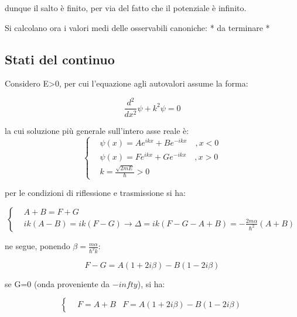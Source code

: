 \documentclass{article}
\begin{document}
dunque il salto è finito, per via del fatto che il potenziale è infinito.

Si calcolano ora i valori medi delle osservabili canoniche: * da terminare *

\subsection{Stati del continuo}
Considero E>0, per cui l'equazione agli autovalori assume la forma:

\begin{equation}
    \frac{d^2}{dx^2} \psi+k^2\psi=0
\end{equation}

la cui soluzione più generale sull'intero asse reale è:
\begin{equation}
    \left\{
    \begin{aligned}
         & \psi(x)=Ae^{ikx}+Be^{-ikx} \quad , x<0 \\
         & \psi(x)=Fe^{ikx}+Ge^{-ikx} \quad , x>0 \\
         & k=\frac{\sqrt{2mE}}{\hbar}>0
    \end{aligned}
    \right.
\end{equation}

per le condizioni di riflessione e trasmissione si ha:

\begin{equation}
    \left\{
    \begin{aligned}
         & A+B=F+G                                                                        \\
         & ik(A-B)=ik(F-G) \rightarrow \Delta= ik(F-G-A+B)=-\frac{2m\alpha}{\hbar^2}(A+B)
    \end{aligned}
    \right.
\end{equation}

ne segue, ponendo $\beta=\frac{m\alpha}{\hbar^2k}$:

\begin{equation}
    F-G=A(1+2i\beta)-B(1-2i\beta)
\end{equation}

se G=0 (onda proveniente da $-infty$), si ha:

\begin{equation}
    \left\{
    \begin{aligned}
         & F=A+B
         & F= A(1+2i\beta)-B(1-2i\beta)
    \end{aligned}
    \right.
\end{equation}
\end{document}
